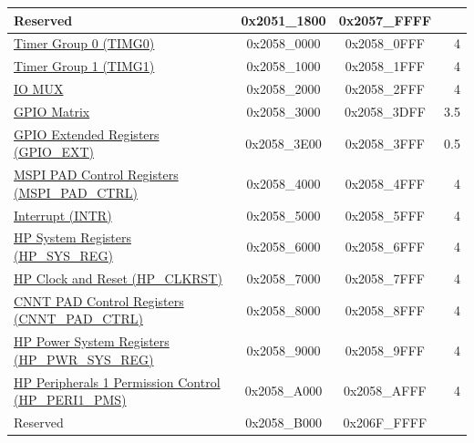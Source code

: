 \begin{ThreePartTable}
\begin{longtable}[c]{ |p{7cm}|c|c|r| }
        \rowcolor{gray!25}  Reserved        & 0x2051\_1800 & 0x2057\_FFFF &    \\\hline
    \hyperref[mod:timg]{Timer Group 0 (TIMG0)} & 0x2058\_0000 & 0x2058\_0FFF &   4\\\hline
    \hyperref[mod:timg]{Timer Group 1 (TIMG1)} & 0x2058\_1000 & 0x2058\_1FFF &   4\\\hline
    \hyperref[mod:iomuxgpio]{IO MUX}       & 0x2058\_2000 & 0x2058\_2FFF &   4\\\hline
    \hyperref[mod:iomuxgpio]{GPIO Matrix} & 0x2058\_3000 & 0x2058\_3DFF & 3.5\\\hline
    \hyperref[mod:iomuxgpio]{GPIO Extended Registers (GPIO\_EXT)} & 0x2058\_3E00 & 0x2058\_3FFF & 0.5\\\hline
    \hyperref[mod:spi]{MSPI PAD Control Registers (MSPI\_PAD\_CTRL)} & 0x2058\_4000 & 0x2058\_4FFF &   4\\\hline
    \hyperref[mod:intmtrx]{Interrupt (INTR)} & 0x2058\_5000 & 0x2058\_5FFF &   4\\\hline
    \hyperref[mod:sysreg]{HP System Registers (HP\_SYS\_REG)} & 0x2058\_6000 & 0x2058\_6FFF &   4\\\hline
    \hyperref[mod:resclk]{HP Clock and Reset (HP\_CLKRST)} & 0x2058\_7000 & 0x2058\_7FFF &   4\\\hline
    \hyperref[mod:sysreg]{CNNT PAD Control Registers (CNNT\_PAD\_CTRL)} & 0x2058\_8000 & 0x2058\_8FFF &   4\\\hline
    \hyperref[mod:sysreg]{HP Power System Registers (HP\_PWR\_SYS\_REG)} & 0x2058\_9000 & 0x2058\_9FFF &   4 \\\hline
    \hyperref[mod:permctrl]{HP Peripherals 1 Permission Control (HP\_PERI1\_PMS)} & 0x2058\_A000 & 0x2058\_AFFF &   4\\\hline
        \rowcolor{gray!25}  Reserved        & 0x2058\_B000 & 0x206F\_FFFF &    \\\hline


\end{longtable}
\end{ThreePartTable}
